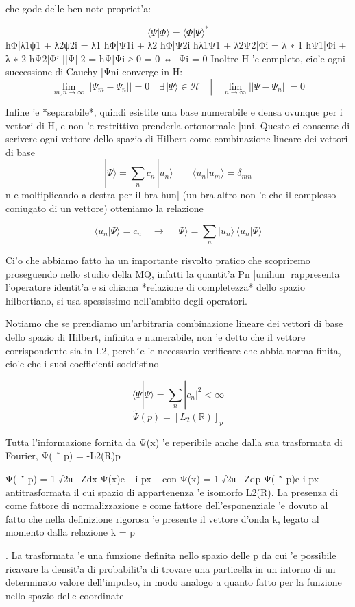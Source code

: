 che gode delle ben note propriet'a:

$$\langle\Psi|\Phi\rangle=\langle\Phi|\Psi\rangle^{*}$$
hΦ|λ1ψ1 + λ2ψ2i = λ1 hΦ|Ψ1i + λ2 hΦ|Ψ2i hλ1Ψ1 + λ2Ψ2|Φi = λ ∗ 1 hΨ1|Φi + λ ∗ 2 hΨ2|Φi ||Ψ||2 = hΨ|Ψi ≥ 0 = 0 ⇔ |Ψi = 0 Inoltre H 'e completo, cio'e ogni successione di Cauchy {|Ψni} converge in H:
$$\operatorname*{lim}_{m,n\to\infty}||\Psi_{m}-\Psi_{n}||=0\quad\exists\,|\Psi\rangle\in{\mathcal{H}}\quad\left|\quad\operatorname*{lim}_{n\to\infty}||\Psi-\Psi_{n}||=0\right.$$

Infine 'e *separabile*, quindi esistite una base numerabile e densa ovunque per i vettori di H, e non 'e restrittivo prenderla ortonormale {|uni}. Questo ci consente di scrivere ogni vettore dello spazio di Hilbert come combinazione
lineare dei vettori di base
$$|\Psi\rangle=\sum_{n}c_{n}\,|u_{n}\rangle\qquad\langle u_{n}|u_{m}\rangle=\delta_{m n}$$
n e moltiplicando a destra per il bra hun| (un bra altro non 'e che il complesso coniugato di un vettore) otteniamo la relazione

$$\langle u_{n}|\Psi\rangle=c_{n}\quad\longrightarrow\quad|\Psi\rangle=\sum_{n}|u_{n}\rangle\,\langle u_{n}|\Psi\rangle$$

Ci'o che abbiamo fatto ha un importante risvolto pratico che scopriremo proseguendo nello studio della MQ,
infatti la quantit'a Pn |unihun| rappresenta l'operatore identit'a e si chiama *relazione di completezza* dello spazio hilbertiano, si usa spessissimo nell'ambito degli operatori.

Notiamo che se prendiamo un'arbitraria combinazione lineare dei vettori di base dello spazio di Hilbert, infinita e numerabile, non 'e detto che il vettore corrispondente sia in L2, perch´e 'e necessario verificare che abbia norma finita, cio'e che i suoi coefficienti soddisfino

$$\langle\Psi|\Psi\rangle=\sum_{n}|c_{n}|^{2}<\infty$$
$${\tilde{\Psi}}(p)=\left[L_{2}(\mathbb{R})\right]_{p}$$

Tutta l'informazione fornita da Ψ(x) 'e reperibile anche dalla sua trasformata di Fourier, Ψ( ˜ p) = -L2(R)p

Ψ( ˜ p) = 1 √2π~ Zdx Ψ(x)e −i px ~ con Ψ(x) = 1 √2π~ Zdp Ψ( ˜ p)e i px ~ antitrasformata
il cui spazio di appartenenza 'e isomorfo L2(R). La presenza di ~ come fattore di normalizzazione e come fattore dell'esponenziale 'e dovuto al fatto che nella definizione rigorosa 'e presente il vettore d'onda k, legato al momento dalla relazione k =
p
~

. La trasformata 'e una funzione definita nello spazio delle p da cui 'e possibile ricavare la densit'a di probabilit'a di trovare una particella in un intorno di un determinato valore dell'impulso, in modo analogo a quanto fatto per la funzione nello spazio delle coordinate

